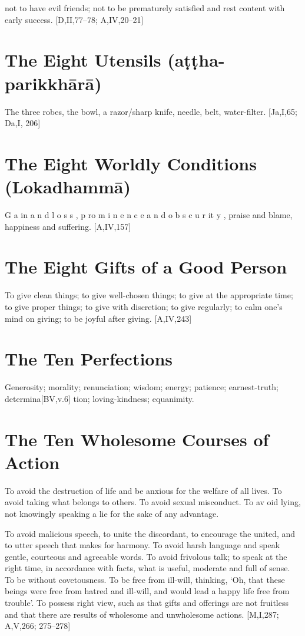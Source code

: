 not to have evil friends; not to be prematurely
satisfied and rest content with early success.
[D,II,77–78; A,IV,20–21]

\section{The Eight Utensils (aṭṭha-parikkhārā)}

The three robes, the bowl, a razor/sharp
knife, needle, belt, water-filter. [Ja,I,65; Da,I, 206]

\section{The Eight Worldly Conditions (Lokadhammā)}

G a in a n d l o s s , p ro m i n e n c e a n d o b s c u r it y ,
praise and blame, happiness and suffering.
[A,IV,157]

\section{The Eight Gifts of a Good Person}

To give clean things; to give well-chosen
things; to give at the appropriate time; to give
proper things; to give with discretion; to give
regularly; to calm one's mind on giving; to be
joyful after giving.
[A,IV,243]

\section{The Ten Perfections}

Generosity; morality; renunciation; wisdom;
energy; patience; earnest-truth; determina[BV,v.6]
tion; loving-kindness; equanimity.

\section{The Ten Wholesome Courses of Action}

To avoid the destruction of life and be anxious for the welfare of all lives. To avoid taking what belongs to others. To avoid sexual
misconduct. To av oid lying, not knowingly
speaking a lie for the sake of any advantage.

To avoid malicious speech, to unite the
discordant, to encourage the united, and to
utter speech that makes for harmony. To
avoid harsh language and speak gentle, courteous and agreeable words. To avoid frivolous
talk; to speak at the right time, in accordance
with facts, what is useful, moderate and full
of sense. To be without covetousness. To be
free from ill-will, thinking, ‘Oh, that these
beings were free from hatred and ill-will, and
would lead a happy life free from trouble’. To
possess right view, such as that gifts and
offerings are not fruitless and that there are
results of wholesome and unwholesome
actions.
[M,I,287; A,V,266; 275–278]

